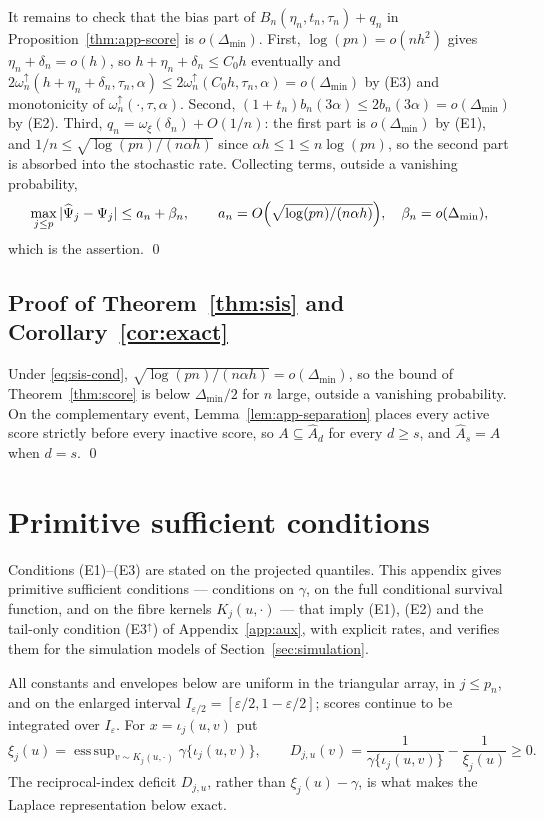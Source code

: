\documentclass[bj,authoryear]{imsart}
\theoremstyle{plain}
\DeclareMathOperator*{\esssup}{ess\,sup}
\newcommand{\A}{A}\newcommand{\I}{I_\varepsilon}
\begin{document}
\begin{appendix}
It remains to check that the bias part of $B_n(\eta_n,t_n,\tau_n)+q_n$ in
Proposition~\ref{thm:app-score} is
$o(\Delta_{\min})$.  First, $\log(pn)=o(nh^2)$ gives
$\eta_n+\delta_n=o(h)$, so $h+\eta_n+\delta_n\le C_0h$ eventually and
$2\omega_n^{\uparrow}(h+\eta_n+\delta_n,\tau_n,\alpha)\le2\omega_n^{\uparrow}(C_0h,\tau_n,\alpha)
=o(\Delta_{\min})$ by (E3) and monotonicity of
$\omega_n^{\uparrow}(\cdot,\tau,\alpha)$.  Second,
$(1+t_n)b_n(3\alpha)\le2b_n(3\alpha)=o(\Delta_{\min})$ by (E2).  Third,
$q_n=\omega_\xi(\delta_n)+O(1/n)$: the first part is
$o(\Delta_{\min})$ by (E1), and
$1/n\le\sqrt{\log(pn)/(n\alpha h)}$ since $\alpha h\le1\le n\log(pn)$, so
the second part is absorbed into the stochastic rate.  Collecting terms,
outside a vanishing probability,
\[
 \max_{j\le p}|\widehat\Psi_j-\Psi_j|
 \le a_n+\beta_n,\qquad
 a_n=O\Bigl(\sqrt{\log(pn)/(n\alpha h)}\Bigr),\quad
 \beta_n=o(\Delta_{\min}),
\]
which is the assertion.  \qed

\subsection{Proof of Theorem~\ref{thm:sis} and
Corollary~\ref{cor:exact}}

Under \eqref{eq:sis-cond},
$\sqrt{\log(pn)/(n\alpha h)}=o(\Delta_{\min})$, so the bound of
Theorem~\ref{thm:score} is below $\Delta_{\min}/2$ for $n$ large,
outside a vanishing probability.  On the complementary event,
Lemma~\ref{lem:app-separation} places every active score strictly before
every inactive score, so $\A\subseteq\widehat\A_d$ for every $d\ge s$,
and $\widehat\A_s=\A$ when $d=s$.  \qed

\section{Primitive sufficient conditions}
\label{app:primitive}
\renewcommand{\theequation}{C.\arabic{equation}}
\setcounter{equation}{0}

Conditions (E1)--(E3) are stated on the projected quantiles. This
appendix gives primitive sufficient conditions --- conditions on
$\gamma$, on the full conditional survival function, and on the fibre
kernels $K_j(u,\cdot)$ --- that imply (E1), (E2) and the tail-only
condition (E3$^\uparrow$) of Appendix~\ref{app:aux}, with explicit
rates, and verifies them for the simulation models of
Section~\ref{sec:simulation}.

All constants and envelopes below are uniform in the triangular array,
in $j\le p_n$, and on the enlarged interval
$I_{\varepsilon/2}=[\varepsilon/2,1-\varepsilon/2]$; scores continue to
be integrated over $\I$. For $x=\iota_j(u,v)$ put
\begin{equation}\label{eq:deficit}
 \xi_j(u)=\esssup_{v\sim K_j(u,\cdot)}\gamma\{\iota_j(u,v)\},
 \qquad
 D_{j,u}(v)=\frac1{\gamma\{\iota_j(u,v)\}}-\frac1{\xi_j(u)}\ge0.
\end{equation}
The reciprocal-index deficit $D_{j,u}$, rather than
$\xi_j(u)-\gamma$, is what makes the Laplace representation below exact.


\end{appendix}
\end{document}
